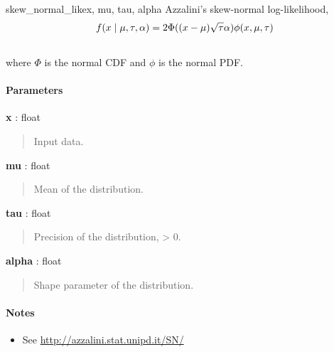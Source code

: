\hypertarget{pymc.distributions.skew_normal_like}{}
\begin{funcdesc}{skew\_normal\_like}{x, mu, tau, alpha}
Azzalini's skew-normal log-likelihood,
\begin{gather}
\begin{split}f(x \mid \mu, \tau, \alpha) = 2 \Phi((x-\mu)\sqrt{\tau}\alpha) \phi(x,\mu,\tau)\end{split}\notag\\\begin{split}\end{split}\notag
\end{gather}
where $\Phi$ is the normal CDF and $\phi$ is the normal PDF.

\paragraph{Parameters}\begin{paramlist}

\item[] \textbf{x} : float
\begin{quote}

Input data.
\end{quote}

\item[] \textbf{mu} : float
\begin{quote}

Mean of the distribution.
\end{quote}

\item[] \textbf{tau} : float
\begin{quote}

Precision of the distribution, \textgreater{} 0.
\end{quote}

\item[] \textbf{alpha} : float
\begin{quote}

Shape parameter of the distribution.
\end{quote}
\end{paramlist}
\paragraph{Notes}
\begin{itemize}
\item {} 
See \href{http://azzalini.stat.unipd.it/SN/}{http://azzalini.stat.unipd.it/SN/}

\end{itemize}
\end{funcdesc}

